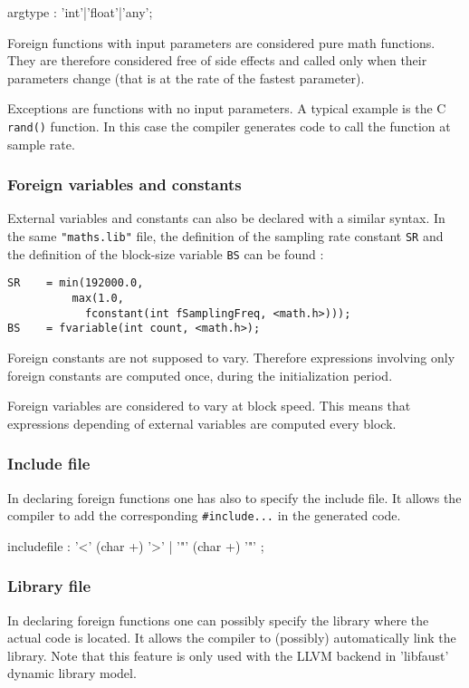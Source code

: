 \begin{rail}
	argtype : 'int'|'float'|'any';
\end{rail}

Foreign functions with input parameters are considered pure math functions. They are therefore considered free of side effects and called only when their parameters change (that is at the rate of the fastest parameter). 

Exceptions are functions with no input parameters. A typical example is the C \lstinline'rand()' function. In this case the compiler generates code to call the function at sample rate.

\subsubsection{Foreign variables and constants} 
External variables and constants can also be declared with a similar syntax. In the same \lstinline'"maths.lib"' file, the definition of the sampling rate constant \lstinline'SR' and the definition of the block-size variable \lstinline'BS' can be found :

\begin{lstlisting}
SR    = min(192000.0, 
	      max(1.0, 
	    	fconstant(int fSamplingFreq, <math.h>)));
BS    = fvariable(int count, <math.h>);
\end{lstlisting}

Foreign constants are not supposed to vary. Therefore expressions involving only foreign constants are computed once, during the initialization period. 

Foreign variables are considered to vary at block speed. This means that expressions depending of external variables are computed every block.

\subsubsection{Include file}
In declaring foreign functions one has also to specify the include file. It allows the \faust compiler to add the corresponding \lstinline'#include...' in the generated code.

\begin{rail}
includefile : '<' (char +) '>' | '"' (char +) '"' ;
\end{rail}

\subsubsection{Library file}
In declaring foreign functions one can possibly specify the library where the actual code is located. It allows the \faust compiler to (possibly) automatically link the library. Note that this feature is only used with the LLVM backend in 'libfaust' dynamic library model.

